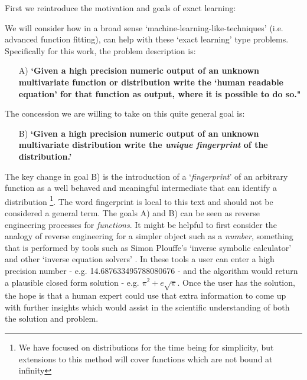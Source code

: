 \documentclass{article}
\begin{document}
First we reintroduce the motivation and goals of exact learning:


We will consider how in a broad sense `machine-learning-like-techniques' (i.e. advanced function fitting), can help with these `exact learning' type problems. Specifically for this work, the problem description is: 
\begin{enumerate}
\item[A)] \textbf{`Given a high precision numeric output of an unknown multivariate function or distribution write the `human readable equation' for that function as output, where it is possible to do so."}
\end{enumerate}
The concession we are willing to take on this quite general goal is:
\begin{enumerate}
\item[B)] \textbf{`Given a high precision numeric output of an unknown multivariate distribution write the \emph{unique fingerprint} of the distribution.'}
\end{enumerate}

The key change in goal B) is the introduction of a `\emph{fingerprint}' of an arbitrary function as a well behaved and meaningful intermediate that can identify a distribution \footnote{We have focused on distributions for the time being for simplicity, but extensions to this method will cover functions which are not bound at infinity}. The word fingerprint is local to this text and should not be considered a general term. The goals A) and B) can be seen as reverse engineering processes for \emph{functions}. It might be helpful to first consider the analogy of reverse engineering for a simpler object such as a \emph{number}, something that is performed by tools such as Simon Plouffe's `inverse symbolic calculator' \cite{Plouffe1986} and other `inverse equation solvers' \cite{Munafo}. In these tools a user can enter a high precision number - e.g. 14.687633495788080676 - and the algorithm would return a plausible closed form solution - e.g. $\pi^2 + e\sqrt{\pi}$. Once the user has the solution, the hope is that a human expert could use that extra information to come up with further insights which would assist in the scientific understanding of both the solution and problem.\\ 
\end{document}
